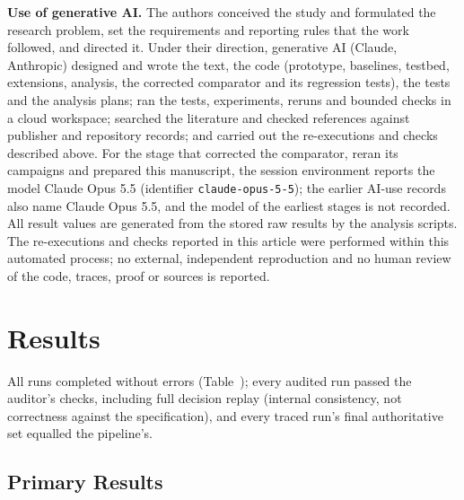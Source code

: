 \textbf{Use of generative AI.} The authors conceived the study and formulated the research problem, set the requirements and reporting rules that the work followed, and directed it. Under their direction, generative AI (Claude, Anthropic) designed and wrote the text, the code (prototype, baselines, testbed, extensions, analysis, the corrected comparator and its regression tests), the tests and the analysis plans; ran the tests, experiments, reruns and bounded checks in a cloud workspace; searched the literature and checked references against publisher and repository records; and carried out the re-executions and checks described above. For the stage that corrected the comparator, reran its campaigns and prepared this manuscript, the session environment reports the model Claude Opus 5.5 (identifier \texttt{claude-opus-5-5}); the earlier AI-use records also name Claude Opus 5.5, and the model of the earliest stages is not recorded. All result values are generated from the stored raw results by the analysis scripts. The re-executions and checks reported in this article were performed within this automated process; no external, independent reproduction and no human review of the code, traces, proof or sources is reported.

\section{Results}\label{sec:results}

All runs completed without errors (Table~); every audited run passed the auditor's checks, including full decision replay (internal consistency, not correctness against the specification), and every traced run's final authoritative set equalled the pipeline's.

\subsection{Primary Results}\label{sec:primary}

